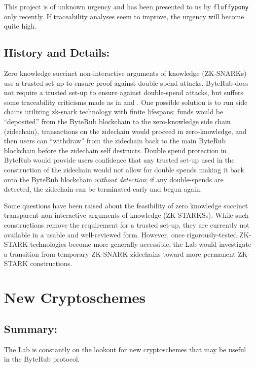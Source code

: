 \documentclass[12pt,english]{mrl}
\theoremstyle{definition}
\numberwithin{equation}{section}
\numberwithin{figure}{section}
\numberwithin{equation}{section}
\numberwithin{equation}{section}
\numberwithin{figure}{section}
\begin{document}
This project is of unknown urgency and has been presented to us by \texttt{fluffypony} only recently. If traceability analyses seem to improve, the urgency will become quite high.

\subsection{History and Details:} 

Zero knowledge succinct non-interactive arguments of knowledge (ZK-SNARKs) use a trusted set-up to ensure proof against double-spend attacks. ByteRub does not require a trusted set-up to ensure against double-spend attacks, but suffers some traceability criticisms made as in \cite{miller2017empirical} and \cite{kumar2017traceability}. One possible solution is to run side chains utilizing zk-snark technology with finite lifespans; funds would be ``deposited'' from the ByteRub blockchain to the zero-knowledge side chain (zidechain), transactions on the zidechain would proceed in zero-knowledge, and then users can ``withdraw'' from the zidechain back to the main ByteRub blockchain before the zidechain self destructs. Double spend protection in ByteRub would provide users confidence that any trusted set-up used in the construction of the zidechain would not allow for double spends making it back onto the ByteRub blockchain \textit{without detection}; if any double-spends are detected, the zidechain can be terminated early and begun again.

Some questions have been raised about the feasibility of zero knowledge succinct transparent non-interactive arguments of knowledge (ZK-STARKSs). While such constructions remove the requirement for a trusted set-up, they are currently not available in a usable and well-reviewed form. However, once rigorously-tested ZK-STARK technologies become more generally accessible, the Lab would investigate a transition from temporary ZK-SNARK zidechains toward more permanent ZK-STARK constructions.



\section{New Cryptoschemes}


\subsection{Summary:} 

The Lab is constantly on the lookout for new cryptoschemes that may be useful in the ByteRub protocol.
\end{document}
